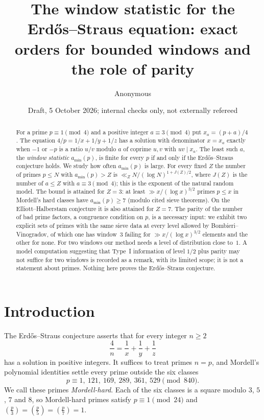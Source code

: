 \documentclass[11pt,reqno]{amsart}
\title[The window statistic for Erd\H{o}s--Straus]{The window statistic for the Erd\H{o}s--Straus equation: exact orders for bounded windows and the role of parity}
\author{Anonymous}
\date{Draft, 5 October 2026; internal checks only, not externally refereed}
\theoremstyle{definition}
\newcommand{\amin}{a_{\min}}
\newcommand{\leg}[2]{\left(\frac{#1}{#2}\right)}
\begin{document}
\begin{abstract}
For a prime $p\equiv1\pmod 4$ and a positive integer $a\equiv3\pmod4$ put
$x_a=(p+a)/4$.  The equation $4/p=1/x+1/y+1/z$ has a solution with
denominator $x=x_a$ exactly when $-1$ or $-p$ is a ratio $u/v$ modulo $a$
of coprime $u,v$ with $uv\mid x_a$.  The least such $a$, the \emph{window
statistic} $\amin(p)$, is finite for every $p$ if and only if the
Erd\H{o}s--Straus conjecture holds.  We study how often $\amin(p)$ is
large.  For every fixed $Z$ the number of primes $p\le N$ with
$\amin(p)>Z$ is $\ll_Z N/(\log N)^{1+J(Z)/2}$, where $J(Z)$ is the number of
$a\le Z$ with $a\equiv3\pmod4$; this is the exponent of the natural random
model.  The bound is attained for $Z=3$: at least $\gg x/(\log x)^{3/2}$
primes $p\le x$ in Mordell's hard classes have $\amin(p)\ge7$ (modulo
cited sieve theorems).  On the Elliott--Halberstam conjecture it is also
attained for $Z=7$.  The parity of the number of bad prime factors, a
congruence condition on $p$, is a necessary input: we exhibit two explicit
sets of primes with the same sieve data at every level allowed by
Bombieri--Vinogradov, of which one has window~3 failing for
$\gg x/(\log x)^{3/2}$ elements and the other for none.  For two windows our
method needs a level of distribution close to~$1$.  A model computation
suggesting that Type~I information of level $1/2$ plus parity may not
suffice for two windows is recorded as a remark, with its limited scope;
it is not a statement about primes.
Nothing here proves the Erd\H{o}s--Straus conjecture.
\end{abstract}
\maketitle

\section{Introduction}\label{sec:intro}

The Erd\H{o}s--Straus conjecture asserts that for every integer $n\ge2$
\begin{equation}\label{eq:ES}
 \frac4n=\frac1x+\frac1y+\frac1z
\end{equation}
has a solution in positive integers.  It suffices to treat primes $n=p$,
and Mordell's polynomial identities \cite{Mordell} settle every prime
outside the six classes
\[
 p\equiv1,\ 121,\ 169,\ 289,\ 361,\ 529\pmod{840}.
\]
We call these primes \emph{Mordell-hard}.  Each of the six classes is a
square modulo $3$, $5$, $7$ and $8$, so Mordell-hard primes satisfy
$p\equiv1\pmod{24}$ and $\leg p3=\leg p5=\leg p7=1$.
\end{document}
